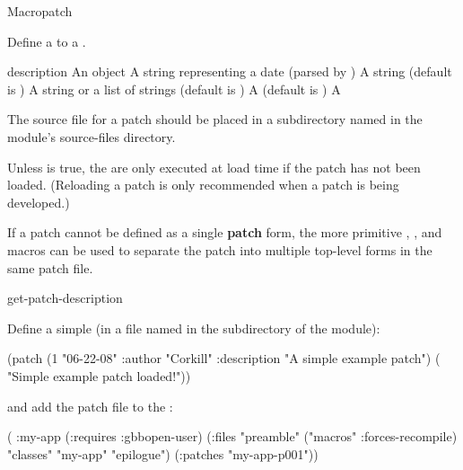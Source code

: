 \documentclass[10pt,twoside,english,pdftex]{article}
\begin{document}
\begin{functiondoc}{Macro}{patch}%
  {\code{(}
     \code{)}
    \superstar} 
%
%

\fnsyntax 

\fnpurpose Define a  to a .

\fnpackage {}

\fnmodule {}

\fnargs
\begin{args}{description}
\arg[id] An object
\arg[date] A string representing a date (parsed by 
  \textbf{})
\arg[author] A string (default is )
\arg[description] A string or a list of strings (default is \nil)
\arg[reload] A  (default is \nil)
\arg[form] A 
\end{args}

\fndescription 
%
The source file for a patch should be placed in a subdirectory named
 in the module's source-files directory.

Unless  is true, the   are
only executed at load time if the patch has not been loaded.  (Reloading a
patch is only recommended when a patch is being developed.)

If a patch cannot be defined as a single \textbf{patch} form, the more
primitive \textbf{}, \textbf{},
and \textbf{} macros can be used to separate the patch
into multiple top-level forms in the same patch file.

\begin{alsos}{get-patch-description}
\also[undefmethod]
\end{alsos}

\fnexample 
%
Define a simple  (in a file named  in the
 subdirectory of the module):
%
%
%
%
\W\supp
\begin{example}
  (patch (1 "06-22-08" 
            :author "Corkill"
            :description "A simple example patch")
      ( "Simple example patch loaded!"))
\end{example}
%
and add the patch file to the  :
%
\W\supp\notpretop
\begin{example}
  ( :my-app
    (:requires :gbbopen-user)
    (:files "preamble"
            ("macros" :forces-recompile)
            "classes"
            "my-app"
            "epilogue")
    (:patches "my-app-p001"))
\end{example}

\end{functiondoc}
\end{document}
